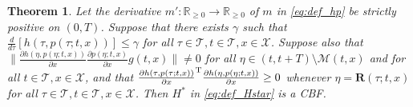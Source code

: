 \documentclass[10pt,conference]{ieeeconf}
\renewcommand{\(}{\left(}
\renewcommand{\)}{\right)}
\renewcommand{\[}{\left[}
\renewcommand{\]}{\right]}
\newcommand{\reals}{\mathbb{R}}
\newtheorem{theorem}{Theorem}
\begin{document}
\begin{theorem}%
\label{thm:is_a_cbf}
Let the derivative $m':\reals_{\geq0}\rightarrow\reals_{\geq0}$ of $m$ in \eqref{eq:def_hp} be strictly positive on $(0,T)$. Suppose that there exists $\gamma$ such that $\frac{d}{d\tau}[h(\tau,p(\tau;t,x))] \leq \gamma$ for all $\tau\in\mathcal{T},t\in\mathcal{T},x\in\mathcal{X}$. Suppose also that $\| \frac{\partial h(\eta, p(\eta; t,x))}{\partial x}\frac{\partial p(\eta; t,x)}{\partial x} g(t,x) \| \neq 0$ for all $\eta \in (t,t+T)\setminus {\mathscr{M}}(t,x)$ and for all $t\in\mathcal{T},x\in\mathcal{X}$, and that $\frac{\partial h(\tau, p(\tau;t,x))}{\partial x}^\textnormal{\textrm{T}} \frac{\partial h(\eta, p(\eta;t,x))}{\partial x} \geq 0$ whenever $\eta = \boldsymbol{R}(\tau;t,x)$ for all $\tau\in\mathcal{T},t\in\mathcal{T},x\in\mathcal{X}$. Then $H^*$ in \eqref{eq:def_Hstar} is a CBF.
\end{theorem}
\end{document}
